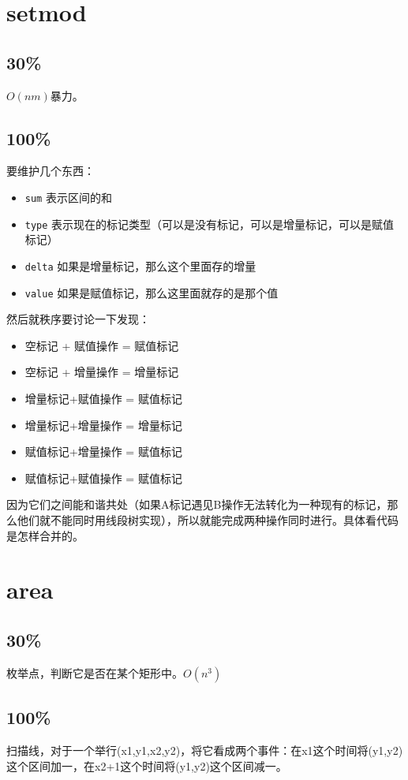 \documentclass{article}
\begin{document}
	\section{setmod}
		\subsection{30\%}
			$O(nm)$暴力。
		\subsection{100\%}
			要维护几个东西：
			\begin{itemize}
				\item \texttt{sum} 表示区间的和
				\item \texttt{type} 表示现在的标记类型（可以是没有标记，可以是增量标记，可以是赋值标记）
				\item \texttt{delta} 如果是增量标记，那么这个里面存的增量
				\item \texttt{value} 如果是赋值标记，那么这里面就存的是那个值
			\end{itemize}
			然后就秩序要讨论一下发现：
			\begin{itemize}
				\item 空标记 + 赋值操作 = 赋值标记
				\item 空标记 + 增量操作 = 增量标记
				\item 增量标记+赋值操作 = 赋值标记
				\item 增量标记+增量操作 = 增量标记
				\item 赋值标记+增量操作 = 赋值标记
				\item 赋值标记+赋值操作 = 赋值标记
			\end{itemize}
			因为它们之间能和谐共处（如果A标记遇见B操作无法转化为一种现有的标记，那么他们就不能同时用线段树实现），所以就能完成两种操作同时进行。具体看代码是怎样合并的。
			
			\newpage
			
	\section{area}
		\subsection{30\%}
			枚举点，判断它是否在某个矩形中。$O(n^3)$
		\subsection{100\%}
			扫描线，对于一个举行(x1,y1,x2,y2)，将它看成两个事件：在x1这个时间将(y1,y2)这个区间加一，在x2+1这个时间将(y1,y2)这个区间减一。
			
\end{document}
